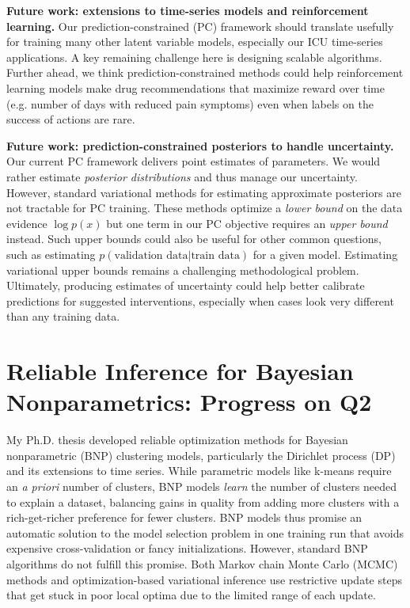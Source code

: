 \documentclass[11pt,letterpaper]{article}
\begin{document}
\textbf{Future work: extensions to time-series models and reinforcement learning.}
Our prediction-constrained (PC) framework should translate usefully for training many other latent variable models, especially our ICU time-series applications. A key remaining challenge here is designing scalable algorithms.
Further ahead, we think prediction-constrained methods could help reinforcement learning models make drug recommendations that maximize reward over time (e.g. number of days with reduced pain symptoms) even when labels on the success of actions are rare.

\textbf{Future work: prediction-constrained posteriors to handle uncertainty.}
Our current PC framework delivers point estimates of parameters.
We would rather estimate \emph{posterior distributions} and thus manage our uncertainty. However, standard variational methods for estimating approximate posteriors are not tractable for PC training. These methods optimize a \emph{lower bound} on the data evidence $\log p(x)$ but one term in our PC objective requires an \emph{upper bound} instead. Such upper bounds could also be useful for other common questions, such as estimating $p(\text{validation data} | \text{train data})$ for a given model.
Estimating variational upper bounds remains a challenging methodological problem.
Ultimately, producing estimates of uncertainty could help better calibrate predictions for suggested interventions, especially when cases look very different than any training data.


\section*{Reliable Inference for Bayesian Nonparametrics: Progress on Q2}

My Ph.D. thesis developed reliable optimization methods for Bayesian nonparametric (BNP) clustering models, particularly the Dirichlet process (DP) and its extensions to time series. 
While parametric models like k-means require an \emph{a priori} number of clusters,
BNP models \emph{learn} the number of clusters needed to explain a dataset,
balancing gains in quality from adding more clusters with a rich-get-richer preference for fewer clusters.
BNP models thus promise an automatic solution to the model selection problem in one training run that avoids expensive cross-validation or fancy initializations. 
However, standard BNP algorithms do not fulfill this promise. Both Markov chain Monte Carlo (MCMC) methods and optimization-based variational inference use restrictive update steps that get stuck in poor local optima due to the limited range of each update.
\end{document}
